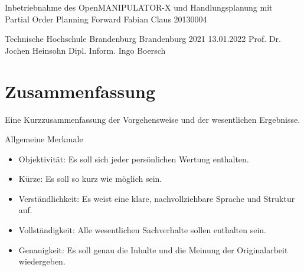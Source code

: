 \usepackage{amssymb}
\usepackage{stmaryrd}




  \JMUTitle
      {Inbetriebnahme des OpenMANIPULATOR-X und Handlungsplanung mit\\ Partial Order Planning Forward}        %
      {Fabian Claus}                        %
      {20130004}
      
      {Technische Hochschule Brandenburg}  %
      {Brandenburg 2021}                          %
      {13.01.2022}                              %
      {Prof. Dr. Jochen Heinsohn}               %
      {Dipl. Inform. Ingo Boersch}                          %

  \clearpage

  
  \lhead{}
  \setcounter{page}{1}

  \tableofcontents
  \clearpage
\section*{Zusammenfassung}

Eine Kurzzusammenfassung der Vorgehensweise und der wesentlichen Ergebnisse.

Allgemeine Merkmale
\begin{itemize}
    \item Objektivität: Es soll sich jeder persönlichen Wertung enthalten.
    \item Kürze: Es soll so kurz wie möglich sein.
    \item Verständlichkeit: Es weist eine klare, nachvollziehbare Sprache und Struktur auf.
    \item Vollständigkeit: Alle wesentlichen Sachverhalte sollen enthalten sein.
    \item Genauigkeit: Es soll genau die Inhalte und die Meinung der Originalarbeit wiedergeben.
\end{itemize}{}

\newpage
{} %
\listoffigures

